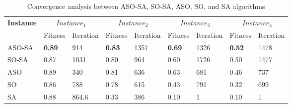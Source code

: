 \begin{table}[!hbt]
\begin{center}
\caption{Convergence analysis between ASO-SA, SO-SA, ASO, SO, and SA algorithms}
\label{convergenceASOSA}
\begin{tabular}{|l|l|l|l|l|l|l|l|l|}
\hline
\multirow{2}{*}{\textbf{Instance}} & \multicolumn{2}{c|}{\textbf{$Instance_1$}} &  \multicolumn{2}{c|}{\textbf{$Instance_2$}}&\multicolumn{2}{c|}{\textbf{$Instance_3$}} &  \multicolumn{2}{c|}{\textbf{$Instance_4$}}
\\ \cline{2-9}
&Fitness&Iteration&Fitness&Iteration&Fitness&Iteration&Fitness&Iteration\\\hline
ASO-SA&\textbf{0.89}&914&\textbf{0.83}&1357&\textbf{0.69}&1326&\textbf{0.52}&1478\\\hline
SO-SA&0.87&1031&0.80&964&0.60&1726&0.50&1477\\\hline
ASO&0.89&340&0.81&636&0.63&681&0.46&737\\\hline
SO&0.86&788&0.78&615&0.43&791&0.32&699\\\hline
SA&0.88&864.6&0.33&386&0.10&1&0.10&1\\\hline
\end{tabular}
\end{center}
\end{table}
